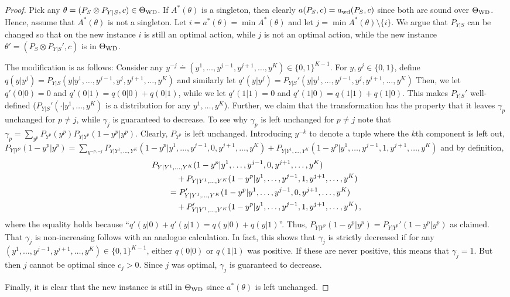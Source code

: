 \begin{proof}
Pick any $\theta = (P_S\otimes P_{Y|S},c)\in \Theta_{\mathrm{WD}}$. If $A^*(\theta)$ is a singleton, then clearly $a(P_S,c) = a_{\mathrm{wd}}(P_S,c)$ since both are sound over $\Theta_{\mathrm{WD}}$.
Hence, assume that $A^*(\theta)$ is not a singleton.
Let $i = a^*(\theta) = \min A^*(\theta)$ and let $j = \min A^*(\theta) \setminus \{ i \}$.
We argue that $P_{Y|S}$ can be changed so that on the new instance $i$ is still an optimal action, while
$j$ is not an optimal action, while the new instance $\theta' = (P_S \otimes P_{Y|S}', c)$ is in $\Theta_{\mathrm{WD}}$.

The modification is as follows:
Consider any $y^{-j} \doteq (y^1,\dots,y^{j-1},y^{j+1},\dots,y^K)\in \{0,1\}^{K-1}$.
For $y,y^j\in \{0,1\}$, define 
$q(y|y^j) = P_{Y|S}(y|y^1, \dots, y^{j-1}, y^j, y^{j+1},\dots, y^K)$
and similarly let
$q'(y|y^j) = P_{Y|S}'(y|y^1, \dots, y^{j-1}, y^j, y^{j+1},\dots, y^K)$
Then, we let $q'(0|0) = 0$ and $q'(0|1) = q(0|0) + q(0|1)$,
while we let  $q'(1|1) = 0$ and $q'(1|0) = q(1|1) + q(1|0)$.
This makes $P_{Y|S}'$ well-defined ($P_{Y|S}'(\cdot|y^1,\dots,y^K)$ is a distribution for any $y^1,\dots,y^K$).
Further, we claim that the transformation has the property that 
it leaves $\gamma_p$ unchanged for $p\ne j$, while $\gamma_j$ is guaranteed to decrease.
To see why $\gamma_p$ is left unchanged for $p\ne j$ note that
$\gamma_p = \sum_{y^p}  P_{Y^p}(y^p) P_{Y|Y^p}(1-y^p|y^p)$.
Clearly, $P_{Y^p}$ is left unchanged.
Introducing $y^{-k}$ to denote a tuple where the $k$th component is left out,
$P_{Y|Y^p}(1-y^p|y^p) = \sum_{y^{-p,-j}} P_{Y|Y^1,\dots,Y^K}( 1-y^p | y^1,\dots, y^{j-1}, 0, y^{j+1}, \dots, y^K )
+P_{Y|Y^1,\dots,Y^K}( 1-y^p | y^1,\dots, y^{j-1}, 1, y^{j+1}, \dots, y^K )$
and by definition,
\begin{align*}
\MoveEqLeft P_{Y|Y^1,\dots,Y^K}( 1-y^p | y^1,\dots, y^{j-1}, 0, y^{j+1}, \dots, y^K )\\
&\quad +P_{Y|Y^1,\dots,Y^K}( 1-y^p | y^1,\dots, y^{j-1}, 1, y^{j+1}, \dots, y^K )\\
&
=
P_{Y|Y^1,\dots,Y^K}'( 1-y^p | y^1,\dots, y^{j-1}, 0, y^{j+1}, \dots, y^K )\\
&\quad+P_{Y|Y^1,\dots,Y^K}'( 1-y^p | y^1,\dots, y^{j-1}, 1, y^{j+1}, \dots, y^K )\,,
\end{align*}
where the equality holds because ``$q'(y|0)+q'(y|1) = q(y|0) + q(y|1)$''.
Thus, $P_{Y|Y^p}(1-y^p|y^p) = P_{Y|Y^p}'(1-y^p|y^p)$ as claimed.
That $\gamma_j$ is non-increasing follows with an analogue calculation.
In fact, this shows that $\gamma_j$ is strictly decreased
if for any $(y^1,\dots,y^{j-1},y^{j+1},\dots,y^K)\in \{0,1\}^{K-1}$, either $q(0|0)$ or $q(1|1)$ was positive.
If these are never positive, this means that $\gamma_j=1$. 
But then $j$ cannot be optimal since $c_j>0$.
Since $j$ was optimal, $\gamma_j$ is guaranteed to decrease.

Finally, it is clear that the new instance is still in $\Theta_{\mathrm{WD}}$ since  $a^*(\theta)$ is left unchanged.
\end{proof}
